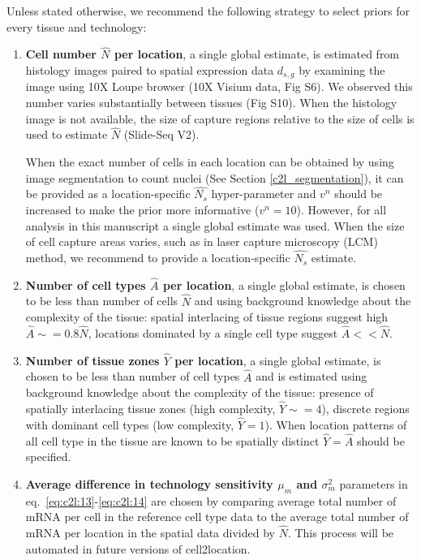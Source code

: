 \documentclass[11pt,a4paper]{article}
\begin{document}
Unless stated otherwise, we recommend the following strategy to select priors for every tissue and technology:
\begin{enumerate}

    \item \textbf{Cell number $\hat{N}$ per location}, a single global estimate, is estimated from histology images paired to spatial expression data $d_{s,g}$ by examining the image using 10X Loupe browser (10X Visium data, Fig S6). We observed this number varies substantially between tissues (Fig S10). When the histology image is not available, the size of capture regions relative to the size of cells is used to estimate $\hat{N}$ (Slide-Seq V2). 
    
    When the exact number of cells in each location can be obtained by using image segmentation to count nuclei (See Section \ref{c2l_segmentation}), it can be provided as a location-specific $\hat{N_s}$ hyper-parameter and $v^{n}$ should be increased to make the prior more informative ($v^{n}=10$). However, for all analysis in this manuscript a single global estimate was used. When the size of cell capture areas varies, such as in laser capture microscopy (LCM) method, we recommend to provide a location-specific $\hat{N_s}$ estimate.
    
    \item \textbf{Number of cell types $\hat{A}$ per location}, a single global estimate, is chosen to be less than number of cells $\hat{N}$ and using background knowledge about the complexity of the tissue: spatial interlacing of tissue regions suggest high $\hat{A} \sim= 0.8 \hat{N}$, locations dominated by a single cell type suggest $\hat{A} << \hat{N}$. 
    
    \item \textbf{Number of tissue zones $\hat{Y}$ per location}, a single global estimate, is chosen to be less than number of cell types $\hat{A}$ and is estimated using background knowledge about the complexity of the tissue: presence of spatially interlacing tissue zones (high complexity, $\hat{Y} \sim= 4$), discrete regions with dominant cell types (low complexity, $\hat{Y} = 1$). When location patterns of all cell type in the tissue are known to be spatially distinct $\hat{Y} = \hat{A}$ should be specified.
    
    \item \textbf{Average difference in technology sensitivity $\mu_m$ and $\sigma_m^2$} parameters in eq.~\eqref{eq:c2l:13}-\eqref{eq:c2l:14} are chosen by comparing average total number of mRNA per cell in the reference cell type data to the average total number of mRNA per location in the spatial data divided by $\hat{N}$. This process will be automated in future versions of cell2location.
\end{enumerate}
\end{document}
